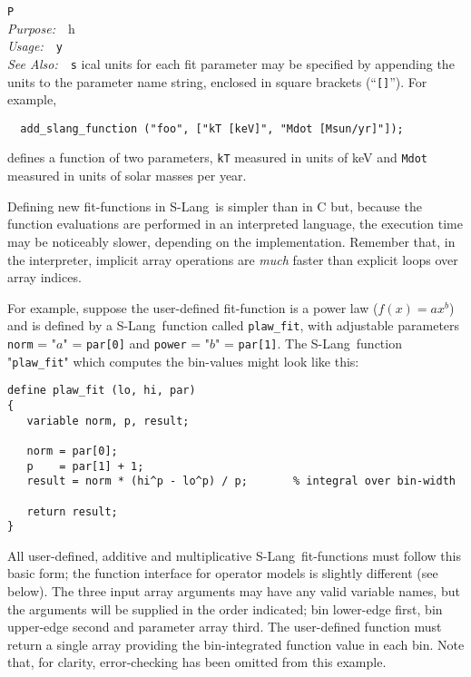 \documentclass{book}
\makeatletter
\newif\ifpdf
\newcommand{\slang}{{\sc S-Lang}}
\newenvironment{isisfunction}[4]%
{\index{{#1}@{\tt #1}}%
  \ifpdf
  \else
     \addcontentsline{toc}{subsection}{{#1} -- {#2}}
  \fi
  \vbox{
          \vspace*{\baselineskip}
          {\LARGE\tt #1}\vspace*{\baselineskip}\\
          {{\it Purpose:}~~{#2}}\\
          {{\it Usage:}~~{\tt #3}}\\
          {{\it See Also:}~~{\tt #4}}
       }
}%
{ }
\makeatother
\begin{document}
{\begin{isisfunction}
Physical units for each fit parameter may be specified by
appending the units to the parameter name string, enclosed in
square brackets (``\verb|[]|'').  For example,
\begin{verbatim}
  add_slang_function ("foo", ["kT [keV]", "Mdot [Msun/yr]"]);
\end{verbatim}
defines a function of two parameters, \verb|kT| measured in
units of keV and \verb|Mdot| measured in units of solar masses
per year.

Defining new fit-functions in \slang\ is simpler than in C but,
because the function evaluations are performed in an
interpreted language, the execution time may be noticeably
slower, depending on the implementation. Remember that, in the
interpreter, implicit array operations are {\it much} faster
than explicit loops over array indices.

For example, suppose the user-defined fit-function is a power
law ($f(x) = ax^b$) and is defined by a \slang\ function called
{\tt plaw\_fit}, with adjustable parameters {\tt norm} = "$a$"
= {\tt par[0]} and {\tt power} = "$b$" = {\tt par[1]}.  The
\slang\ function "{\tt plaw\_fit}" which computes the
bin-values might look like this:
\begin{verbatim}
define plaw_fit (lo, hi, par)
{
   variable norm, p, result;

   norm = par[0];
   p    = par[1] + 1;
   result = norm * (hi^p - lo^p) / p;       % integral over bin-width

   return result;
}
\end{verbatim}

All user-defined, additive and multiplicative \slang\
fit-functions must follow this basic form; the function
interface for operator models is slightly different (see
below). The three input array arguments may have any valid
variable names, but the arguments will be supplied in the order
indicated; bin lower-edge first, bin upper-edge second and
parameter array third.  The user-defined function must return a
single array providing the bin-integrated function value in
each bin. Note that, for clarity, error-checking has been
omitted from this example.


\end{isisfunction}}
\end{document}
